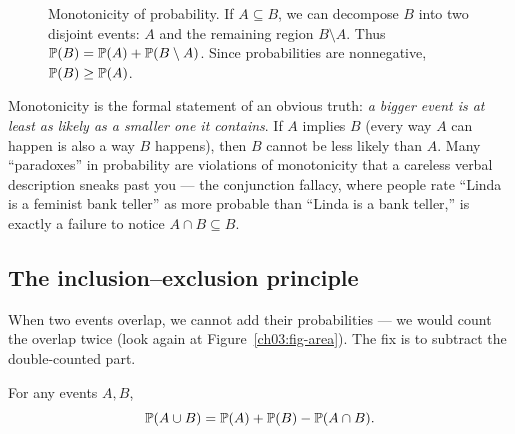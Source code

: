 \begin{figure}[H]
\centering
{}
\caption{Monotonicity of probability. If $A \subseteq B$, we can decompose $B$ into two disjoint events: $A$ and the remaining region $B \setminus A$. Thus $\P(B) = \P(A) + \P(B \setminus A)$. Since probabilities are nonnegative, $\P(B) \ge \P(A)$.}
\label{ch03:fig-monotonicity}
\end{figure}


Monotonicity is the formal statement of an obvious truth: \emph{a bigger event is
at least as likely as a smaller one it contains}. If $A$ implies $B$ (every way
$A$ can happen is also a way $B$ happens), then $B$ cannot be less likely than
$A$. Many ``paradoxes'' in probability are violations of monotonicity that
a careless verbal description sneaks past you --- the conjunction fallacy, where
people rate ``Linda is a feminist bank teller'' as more probable than ``Linda is
a bank teller,'' is exactly a failure to notice $A \cap B \subseteq B$.

\subsection{The inclusion--exclusion principle}
\label{ch03:incl-excl}

When two events overlap, we cannot add their probabilities --- we would
count the overlap twice (look again at Figure~\ref{ch03:fig-area}). The fix is to
subtract the double-counted part.

\begin{theorem}
\label{ch03:thm-ie2}
For any events $A, B$,
\[
\P(A \cup B) = \P(A) + \P(B) - \P(A \cap B).
\]
\end{theorem}

